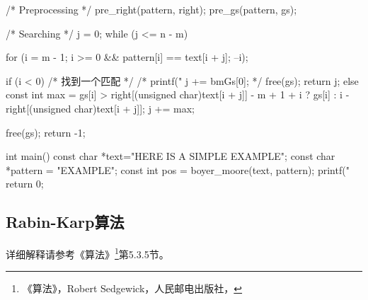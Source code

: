 \begin{Codex}[label=boyer_moore.c]
{    /* Preprocessing */
    pre_right(pattern, right);
    pre_gs(pattern, gs);

    /* Searching */
    j = 0;
    while (j <= n - m) {
        for (i = m - 1; i >= 0 && pattern[i] == text[i + j]; --i);

        if (i < 0) { /* 找到一个匹配 */
            /* printf("%
            j += bmGs[0]; */
            free(gs);
            return j;
        } else {
            const int max = gs[i] > right[(unsigned char)text[i + j]] -
                    m + 1 + i ? gs[i] : i - right[(unsigned char)text[i + j]];
            j += max;
        }
    }
    free(gs);
    return -1;
}


int main() {
    const char *text="HERE IS A SIMPLE EXAMPLE";
    const char *pattern = "EXAMPLE";
    const int pos = boyer_moore(text, pattern);
    printf("%
    return 0;
}
\end{Codex}


\subsection{Rabin-Karp算法}
详细解释请参考《算法》\footnote{《算法》，Robert Sedgewick，人民邮电出版社，}第5.3.5节。

